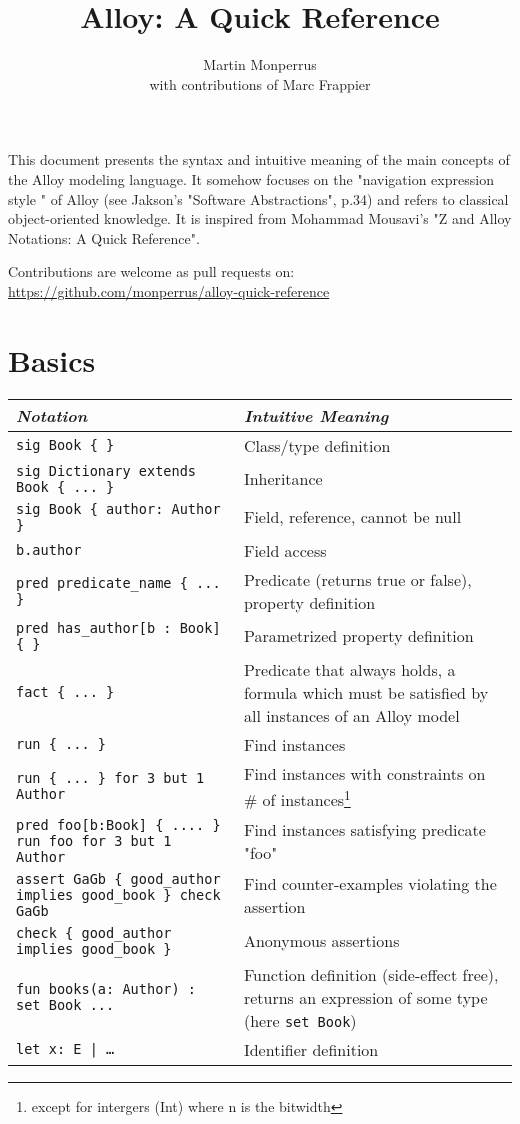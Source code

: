 \documentclass{article}
\title{Alloy: A Quick Reference}
\author{Martin Monperrus\\ with contributions of Marc Frappier}
\newlength\tw
\begin{document}
\maketitle

\noindent This document presents the syntax and intuitive meaning of the main concepts of the Alloy modeling language. It somehow focuses on the "navigation expression style " of Alloy (see Jakson's "Software Abstractions", p.34) and refers to classical object-oriented knowledge. It is inspired from Mohammad Mousavi's "Z and Alloy Notations: A Quick Reference".
\medskip

\noindent Contributions are welcome as pull requests on:\\ \url{https://github.com/monperrus/alloy-quick-reference}

\section{Basics}

\begin{longtable}{|p{\tw}|p{\tw}|}
\hline
\emph{Notation} & \emph{Intuitive Meaning} \\
\hline
\texttt{sig Book \{ \}} & Class/type definition \\
\hline
\texttt{sig Dictionary extends Book \{ ... \}} & Inheritance \\
\hline
\texttt{sig Book \{ author: Author \}} & Field, reference, cannot be null \\
\hline
\texttt{b.author} & Field access\\
\hline
\texttt{pred predicate\_name \{ ... \}} & Predicate (returns true or false), property definition \\
\hline
\texttt{pred has\_author[b : Book] \{  \}} & Parametrized property definition \\
\hline
\texttt{fact \{ ... \}} & Predicate that always holds, a formula which must be satisfied by all instances of an Alloy model\\
\hline
\texttt{run \{ ... \}} & Find instances \\
\hline
\texttt{run \{ ... \} for 3 but 1 Author} & Find instances with constraints on \# of instances\footnote{except for intergers (Int) where n is the bitwidth}\\
\hline
\texttt{pred foo[b:Book] \{ .... \}\newline
run foo for 3 but 1 Author} & Find instances satisfying predicate "foo" \\
\hline
\texttt{assert GaGb \{ good\_author implies  good\_book \}\newline
check GaGb} & Find counter-examples violating the assertion \\
\hline
\texttt{check \{ good\_author implies  good\_book \} } & Anonymous assertions \\
\hline
\texttt{fun books(a: Author) : set Book {...}} & Function definition (side-effect free), returns an expression of some type (here \texttt{set Book}) \\
\hline
\texttt{let x: E | \ldots} & Identifier definition\\
\hline
\end{longtable}
\end{document}
